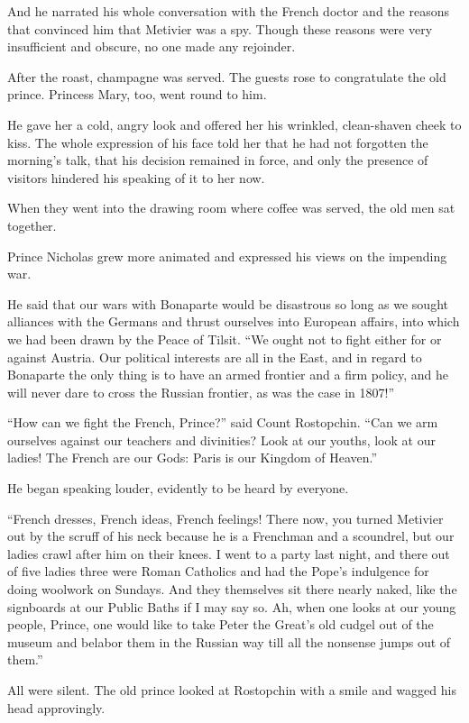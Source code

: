 And he narrated his whole conversation with the French doctor and
the reasons that convinced him that Metivier was a spy. Though
these reasons were very insufficient and obscure, no one made any
rejoinder.

After the roast, champagne was served. The guests rose to
congratulate the old prince. Princess Mary, too, went round to
him.

He gave her a cold, angry look and offered her his wrinkled,
clean-shaven cheek to kiss. The whole expression of his face told
her that he had not forgotten the morning's talk, that his
decision remained in force, and only the presence of visitors
hindered his speaking of it to her now.

When they went into the drawing room where coffee was served, the
old men sat together.

Prince Nicholas grew more animated and expressed his views on the
impending war.

He said that our wars with Bonaparte would be disastrous so long
as we sought alliances with the Germans and thrust ourselves into
European affairs, into which we had been drawn by the Peace of
Tilsit. ``We ought not to fight either for or against
Austria. Our political interests are all in the East, and in
regard to Bonaparte the only thing is to have an armed frontier
and a firm policy, and he will never dare to cross the Russian
frontier, as was the case in 1807!''

``How can we fight the French, Prince?'' said Count
Rostopchin. ``Can we arm ourselves against our teachers and
divinities? Look at our youths, look at our ladies! The French
are our Gods: Paris is our Kingdom of Heaven.''

He began speaking louder, evidently to be heard by everyone.

``French dresses, French ideas, French feelings! There now, you
turned Metivier out by the scruff of his neck because he is a
Frenchman and a scoundrel, but our ladies crawl after him on
their knees. I went to a party last night, and there out of five
ladies three were Roman Catholics and had the Pope's indulgence
for doing woolwork on Sundays.  And they themselves sit there
nearly naked, like the signboards at our Public Baths if I may
say so. Ah, when one looks at our young people, Prince, one would
like to take Peter the Great's old cudgel out of the museum and
belabor them in the Russian way till all the nonsense jumps out
of them.''

All were silent. The old prince looked at Rostopchin with a smile
and wagged his head approvingly.

